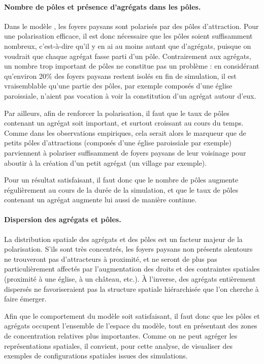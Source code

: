 \paragraph{Nombre de pôles et présence d'agrégats dans les pôles.}\label{par:nb-poles}

Dans le modèle \simfeodal{}, les foyers paysans sont polarisés par des pôles d'attraction.
Pour une polarisation efficace, il est donc nécessaire que les pôles soient suffisamment nombreux, c'est-à-dire qu'il y en ai au moins autant que d'agrégats, puisque on voudrait que chaque agrégat fasse parti d'un pôle.
Contrairement aux agrégats, un nombre trop important de pôles ne constitue pas un problème :
	en considérant qu'environ 20\% des foyers paysans restent isolés en fin de simulation, il est vraisemblable qu'une partie des pôles, par exemple composés d'une église paroissiale, n'aient pas vocation à voir la constitution d'un agrégat autour d'eux.

Par ailleurs, afin de renforcer la polarisation, il faut que le taux de pôles contenant un agrégat soit important, et surtout croissant au cours du temps.
Comme dans les observations empiriques, cela serait alors le marqueur que de petits pôles d'attractions (composés d'une église paroissiale par exemple) parviennent à polariser suffisamment de foyers paysans de leur voisinage pour aboutir à la création d'un petit agrégat (un village par exemple).

Pour un résultat satisfaisant, il faut donc que le nombre de pôles augmente régulièrement au cours de la durée de la simulation, et que le taux de pôles contenant un agrégat augmente lui aussi de manière continue.

\paragraph{Dispersion des agrégats et pôles.}\label{par:polarisation-dispersion}

La distribution spatiale des agrégats et des pôles est un facteur majeur de la polarisation.
S'ils sont très concentrés, les foyers paysans non présents alentours ne trouveront pas d'attracteurs à proximité, et ne seront de plus pas particulièrement affectés par l'augmentation des droits et des contraintes spatiales (proximité à une église, à un château, etc.).
À l'inverse, des agrégats entièrement dispersés ne favoriseraient pas la structure spatiale hiérarchisée que l'on cherche à faire émerger.

Afin que le comportement du modèle soit satisfaisant, il faut donc que les pôles et agrégats occupent l'ensemble de l'espace du modèle, tout en présentant des zones de concentration relatives plus importantes.
Comme on ne peut agréger les représentations spatiales, il convient, pour cette analyse, de visualiser des exemples de configurations spatiales issues des simulations.

